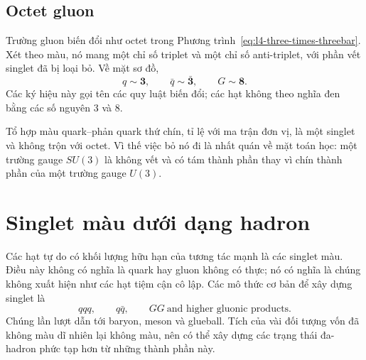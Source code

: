 \begin{classroomqa}
\end{classroomqa}

\subsection{Octet gluon}

Trường gluon biến đổi như octet trong Phương trình~\eqref{eq:l4-three-times-threebar}. Xét theo màu, nó mang một chỉ số triplet và một chỉ số anti-triplet, với phần vết singlet đã bị loại bỏ. Về mặt sơ đồ,
\begin{equation}
q\sim\boldsymbol 3,
\qquad
\bar q\sim\bar{\boldsymbol 3},
\qquad
G\sim\boldsymbol 8.
\end{equation}
Các ký hiệu này gọi tên các quy luật biến đổi; các hạt không theo nghĩa đen bằng các số nguyên 3 và 8.

Tổ hợp màu quark--phản quark thứ chín, tỉ lệ với ma trận đơn vị, là một singlet và không trộn với octet. Vì thế việc bỏ nó đi là nhất quán về mặt toán học: một trường gauge \(SU(3)\) là không vết và có tám thành phần thay vì chín thành phần của một trường gauge \(U(3)\).

\begin{classroomqa}
\end{classroomqa}

\section{Singlet màu dưới dạng hadron}

Các hạt tự do có khối lượng hữu hạn của tương tác mạnh là các singlet màu. Điều này không có nghĩa là quark hay gluon không có thực; nó có nghĩa là chúng không xuất hiện như các hạt tiệm cận cô lập. Các mô thức cơ bản để xây dựng singlet là
\begin{equation}
qqq,
\qquad
q\bar q,
\qquad
GG\ \text{and higher gluonic products}.
\end{equation}
Chúng lần lượt dẫn tới baryon, meson và glueball. Tích của vài đối tượng vốn đã không màu dĩ nhiên lại không màu, nên có thể xây dựng các trạng thái đa-hadron phức tạp hơn từ những thành phần này.

